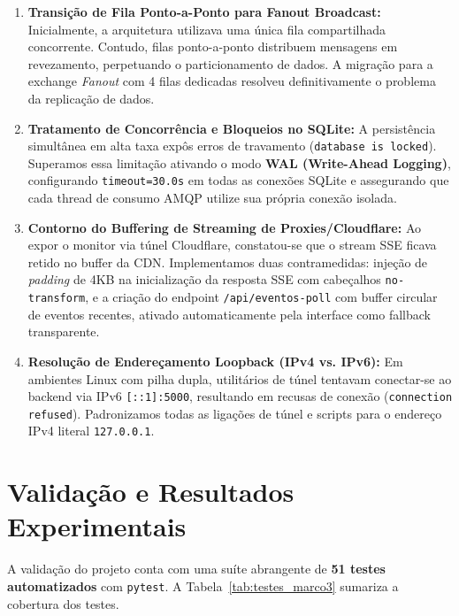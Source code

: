 \documentclass[12pt,a4paper]{article}
\begin{document}
	\begin{enumerate}
		\item \textbf{Transição de Fila Ponto-a-Ponto para Fanout Broadcast:}
		Inicialmente, a arquitetura utilizava uma única fila compartilhada concorrente. Contudo, filas ponto-a-ponto distribuem mensagens em revezamento, perpetuando o particionamento de dados. A migração para a exchange \textit{Fanout} com 4 filas dedicadas resolveu definitivamente o problema da replicação de dados.
		
		\item \textbf{Tratamento de Concorrência e Bloqueios no SQLite:}
		A persistência simultânea em alta taxa expôs erros de travamento (\texttt{database is locked}). Superamos essa limitação ativando o modo \textbf{WAL (Write-Ahead Logging)}, configurando \texttt{timeout=30.0s} em todas as conexões SQLite e assegurando que cada thread de consumo AMQP utilize sua própria conexão isolada.
		
		\item \textbf{Contorno do Buffering de Streaming de Proxies/Cloudflare:}
		Ao expor o monitor via túnel Cloudflare, constatou-se que o stream SSE ficava retido no buffer da CDN. Implementamos duas contramedidas: injeção de \textit{padding} de 4KB na inicialização da resposta SSE com cabeçalhos \texttt{no-transform}, e a criação do endpoint \texttt{/api/eventos-poll} com buffer circular de eventos recentes, ativado automaticamente pela interface como fallback transparente.
		
		\item \textbf{Resolução de Endereçamento Loopback (IPv4 vs. IPv6):}
		Em ambientes Linux com pilha dupla, utilitários de túnel tentavam conectar-se ao backend via IPv6 \texttt{[::1]:5000}, resultando em recusas de conexão (\texttt{connection refused}). Padronizamos todas as ligações de túnel e scripts para o endereço IPv4 literal \texttt{127.0.0.1}.
	\end{enumerate}
	
	\section{Validação e Resultados Experimentais}
	
	A validação do projeto conta com uma suíte abrangente de \textbf{51 testes automatizados} com \texttt{pytest}. A Tabela~\ref{tab:testes_marco3} sumariza a cobertura dos testes.
	
\end{document}
